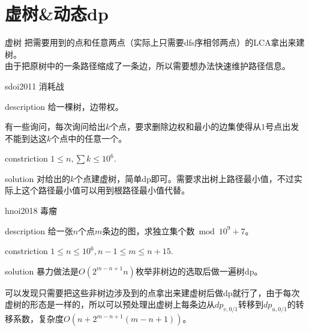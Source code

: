 \documentclass{beamer}
\begin{document}
	\section{虚树\&动态dp}
	\begin{frame}{虚树}
		把需要用到的点和任意两点（实际上只需要dfs序相邻两点）的LCA拿出来建树。\\
		
		由于把原树中的一条路径缩成了一条边，所以需要想办法快速维护路径信息。
		
	\end{frame}
	\begin{frame}{sdoi2011 消耗战}
		\begin{block}{description}
			给一棵树，边带权。
			
			有一些询问，每次询问给出$k$个点，要求删除边权和最小的边集使得从$1$号点出发不能到达这$k$个点中的任意一个。
		\end{block}
		\begin{block}{constriction}
			$1 \le n, \sum k \le 10^6.$
		\end{block}
		\pause
		\begin{block}{solution}
			对给出的$k$个点建虚树，简单dp即可。需要求出树上路径最小值，不过实际上这个路径最小值可以用到根路径最小值代替。
		\end{block}
	\end{frame}
	\begin{frame}{hnoi2018 毒瘤}
		\begin{block}{description}
			给一张$n$个点$m$条边的图，求独立集个数$\bmod 10^9+7$。
		\end{block}
		\begin{block}{constriction}
			$1 \le n \le 10^6, n-1 \le m \le n+15.$
		\end{block}
		\pause
		\begin{block}{solution}
			暴力做法是$O(2^{m-n+1}n)$枚举非树边的选取后做一遍树dp。
			
			可以发现只需要把这些非树边涉及到的点拿出来建虚树后做dp就行了，由于每次虚树的形态是一样的，所以可以预处理出虚树上每条边从$dp_{v,0/1}$转移到$dp_{u,0/1}$的转移系数，复杂度$O(n+2^{m-n+1}(m-n+1))$。
		\end{block}
	\end{frame}
\end{document}
